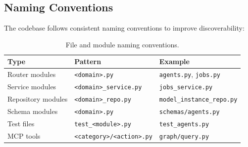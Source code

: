 \subsection{Naming Conventions}

The codebase follows consistent naming conventions to improve discoverability:

\begin{table}[ht]
\centering
\caption{File and module naming conventions.}
\label{tab:naming-conventions}
\small
\begin{tabular}{lll}
\hline
\textbf{Type} & \textbf{Pattern} & \textbf{Example} \\
\hline
Router modules & \texttt{<domain>.py} & \texttt{agents.py}, \texttt{jobs.py} \\
Service modules & \texttt{<domain>\_service.py} & \texttt{jobs\_service.py} \\
Repository modules & \texttt{<domain>\_repo.py} & \texttt{model\_instance\_repo.py} \\
Schema modules & \texttt{<domain>.py} & \texttt{schemas/agents.py} \\
Test files & \texttt{test\_<module>.py} & \texttt{test\_agents.py} \\
MCP tools & \texttt{<category>/<action>.py} & \texttt{graph/query.py} \\
\hline
\end{tabular}
\end{table}


